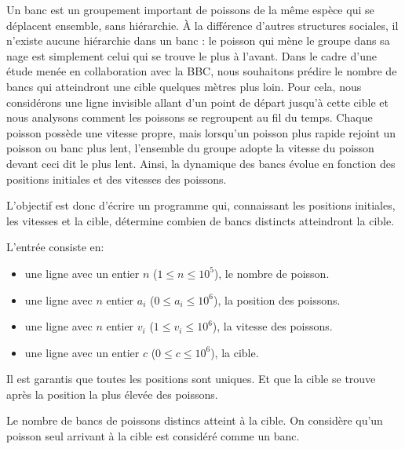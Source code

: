\problemname{}


Un banc est un groupement important de poissons de la même espèce qui se déplacent ensemble, sans hiérarchie. À la différence d'autres structures sociales, il n'existe aucune hiérarchie dans un banc : le poisson qui mène le groupe dans sa nage est simplement celui qui se trouve le plus à l'avant.
Dans le cadre d'une étude menée en collaboration avec la BBC, nous souhaitons prédire le nombre de bancs qui atteindront une cible quelques mètres plus loin.
Pour cela, nous considérons une ligne invisible allant d'un point de départ jusqu'à cette cible et nous analysons comment les poissons se regroupent au fil du temps.
Chaque poisson possède une vitesse propre, mais lorsqu'un poisson plus rapide rejoint un poisson ou banc plus lent, l'ensemble du groupe adopte la vitesse du poisson devant ceci dit le plus lent.
Ainsi, la dynamique des bancs évolue en fonction des positions initiales et des vitesses des poissons.

L'objectif est donc d'écrire un programme qui, connaissant les positions initiales, les vitesses et la cible, détermine combien de bancs distincts atteindront la cible.

\begin{Input}
    L'entrée consiste en:
    \begin{itemize}
        \item une ligne avec un entier $n$ ($1 \leq n \leq 10^{5}$), le nombre de poisson.
        \item une ligne avec $n$ entier $a_i$ ($0 \leq a_i \leq 10^{6}$), la position des poissons.
        \item une ligne avec $n$ entier $v_i$ ($1 \leq v_i \leq 10^{6}$), la vitesse des poissons.
        \item une ligne avec un entier $c$ ($0 \leq c \leq 10^{6}$), la cible.
    \end{itemize}
    Il est garantis que toutes les positions sont uniques. Et que la cible se trouve après la position la plus élevée des poissons.
\end{Input}

\begin{Output}
   Le nombre de bancs de poissons distincs atteint à la cible. On considère qu'un poisson seul arrivant à la cible est considéré comme un banc.
\end{Output}

